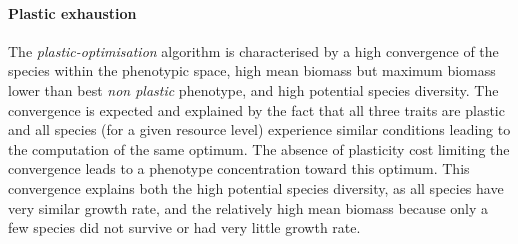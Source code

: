



\paragraph{Plastic exhaustion}

The \textit{plastic-optimisation} algorithm is characterised by a high convergence of the species within the phenotypic space, high mean biomass but maximum biomass lower than best \textit{non plastic} phenotype, and high potential species diversity. The convergence is expected and explained by the fact that all three traits are plastic and all species (for a given resource level) experience similar conditions leading to the computation of the same optimum. The absence of plasticity cost limiting the convergence leads to a phenotype concentration toward this optimum. This convergence explains both the high potential species diversity, as all species have very similar growth rate, and the relatively high mean biomass because only a few species did not survive or had very little growth rate.


